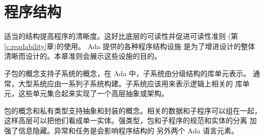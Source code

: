 %
%
%

\chapter{程序结构}

适当的结构提高程序的清晰度。这好比底层的可读性并促进可读性准则
 (第\ref{c:readability}章)的使用。 Ada 提供的各种程序结构设施
是为了增进设计的整体清晰而设计的。本章准则会展示这些设施的目的。

子包的概念支持子系统的概念，在 Ada 中，子系统由分级结构的库单元表示。
通常，大型系统应由一系列子系统构建。子系统应该用来表示逻辑上相关的
库单元，这些单元集合起来实现了一个高层抽象或架构。

包的概念和私有类型支持抽象和封装的概念。相关的数据和子程序可以组在一起，
这样高层可以把他们看成单一实体。强类型，包和子程序的规范和实体的分离
加强了信息隐藏。异常和任务是会影响程序结构的 另外两个 Ada 语言元素。




